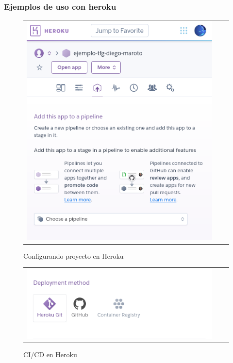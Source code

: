 \subsubsection{Ejemplos de uso con heroku}
\begin{figure}[h]
\centering
\begin{tabular}{ccc}
\includegraphics[scale=0.5]{archivos/heroku01.png}
\end{tabular}
\caption{Configurando proyecto en Heroku}
\end{figure}

\begin{figure}[h]
\centering
\begin{tabular}{ccc}
\includegraphics[scale=0.5]{archivos/heroku02.png}
\end{tabular}
\caption{CI/CD en Heroku}
\end{figure}

